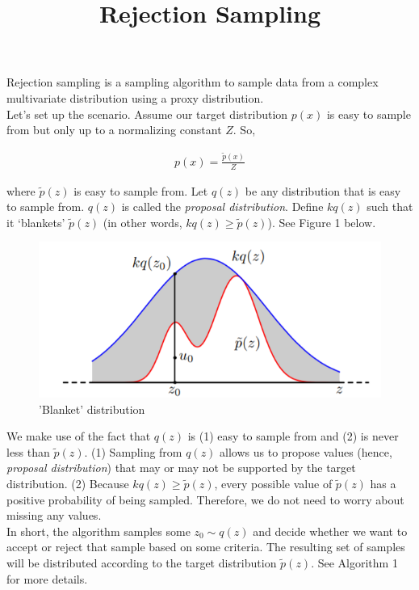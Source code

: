 \documentclass[10pt,a4paper]{article}
\title{Rejection Sampling}
\begin{document}
\maketitle 

Rejection sampling is a sampling algorithm to sample data from a complex multivariate distribution using a proxy distribution.
\\

Let's set up the scenario. Assume our target distribution $p(x)$ is easy to sample from but only up to a normalizing constant $Z$. So,

\begin{align*}
p(x) = \frac{\tilde{p}(x)}{Z}
\end{align*}

\vspace{0.3cm}
\noindent where $\tilde{p}(z)$ is easy to sample from. Let $q(z)$ be any distribution that is easy to sample from. $q(z)$ is called the \textit{proposal distribution}. Define $kq(z)$ such that it `blankets' $\tilde{p}(z)$ (in other words, $kq(z) \geq \tilde{p}(z)$). See Figure 1 below.

\begin{figure}[!h]
\centering
\includegraphics[scale=0.4]{figures/rejection_sampling.png}
\caption{'Blanket' distribution}
\end{figure}


We make use of the fact that $q(z)$ is (1) easy to sample from and (2) is never less than $\tilde{p}(z)$. (1) Sampling from $q(z)$ allows us to propose values (hence, \textit{proposal distribution}) that may or may not be supported by the target distribution. (2) Because $kq(z) \geq \tilde{p}(z)$, every possible value of $\tilde{p}(z)$ has a positive probability of being sampled. Therefore, we do not need to worry about missing any values.
\\

In short, the algorithm samples some $z_0 \sim q(z)$ and decide whether we want to accept or reject that sample based on some criteria. The resulting set of samples will be distributed according to the target distribution $\tilde{p}(z)$. See Algorithm 1 for more details.
\end{document}
